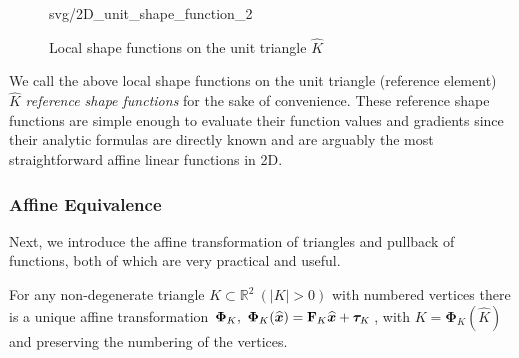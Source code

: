 \begin{figure}[!htbp]
{{{					svg/2D_unit_shape_function_2}}
		}
		\caption{Local shape functions on the unit triangle $\widehat{K}$}
		\label{fig:reference shape functions}
	\end{figure}
	
	We call the above local shape functions on the unit triangle (reference 
	element) $\widehat{K}$ \emph{reference shape functions} for the sake of 
	convenience. These reference shape functions are simple enough to
	evaluate their function values and gradients since their analytic
	formulas are directly known and are arguably the most straightforward
	affine linear functions in 2D.%
	
	\subsubsection*{Affine Equivalence}
	Next, we introduce the affine transformation of triangles and pullback of
	functions, both of which are very practical and useful.
	\begin{lemma}
	For any non-degenerate triangle $K\subset\mathbb{R}^2\ (|K|>0)$ with
	numbered vertices there is a unique affine transformation 
	$\bm{\Phi}_K,\ \bm{\Phi}_K(\widehat{\bx})=\mathbf{F}_K\widehat{\bx}+
	\bm{\tau}_K$, with $K=\bm{\Phi}_K(\widehat{K})$ and preserving the 
	numbering of the vertices.
	\end{lemma}
	
